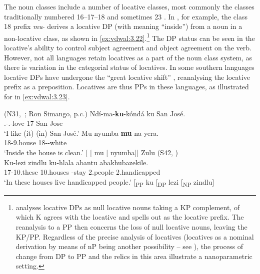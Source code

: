 \documentclass[output=paper]{langsci/langscibook}
\begin{document}
The  noun classes include a number of locative classes, most
commonly the classes traditionally numbered 16--17--18 and sometimes 23
\citep{Meeussen1967}.  In , for example, the class 18 prefix
\emph{mu}- derives a locative DP (with meaning \enquote{inside}) from a noun in
a non-locative class, as shown in
\eqref{ex:vdwal:3.22}.\footnote{\citet{Carstens1997} analyses locative DPs as
    null locative nouns taking a KP complement, of which K agrees with the
    locative and spells out as the locative prefix. The reanalysis to a PP then
    concerns the loss of null locative nouns, leaving the KP/PP. Regardless of
    the precise analysis of locatives (locatives as a nominal derivation by
    means of nP being another possibility – see \citealt{FuchsvanderWal2019}),
the process of change from DP to PP and the relics in this area illustrate a
nanoparametric setting.} The DP status can be seen in the locative’s ability to
control subject agreement and object
agreement on the verb. However, not all
languages retain locatives as a part of the noun class system, as there is
variation in the categorial status of locatives. In some southern 
languages locative DPs have undergone the \enquote{great locative shift}
\citep{Marten2010}, reanalysing the locative prefix as a preposition. Locatives
are thus PPs in these languages, as illustrated for  in
\eqref{ex:vdwal:3.23}.\largerpage

\ea\label{ex:vdwal:3.22}  (N31,~\citealt[58]{Bresnan1991}; Ron Simango, p.c.)
	\ea
	\gll	 Ndí-ma-\textbf{ku}{}-kóndá  ku  San José. \\
	    \Fsg.\Sm{}{}-\Prs{}.\Om{}-love  17  San Jose\\
	\glt    ‘I like (it) (in) San José.’%
	\ex
	\gll	 Mu-nyumba  \textbf{mu}{}-na-yera.\\
	    18-9.house  18\Sm{}-\Pst{}-white\\
	\glt    ‘Inside the house is clean.’%
    \sn {}[ [ mu [ nyumba]]
	\z
\ex\label{ex:vdwal:3.23}Zulu (S42, \citealt{Buell2007})\\
        \gll Ku-lezi  zindlu  ku-hlala  abantu  abakhubazekile. \\
         17-10.these  10.houses  \Expl-stay  2.people  2.handicapped\\
        \glt ‘In these houses live handicapped people.’
    \sn {}[\textsubscript{PP} ku\textsubscript{} [\textsubscript{DP} lezi [\textsubscript{NP} zindlu]
\z
\end{document}
